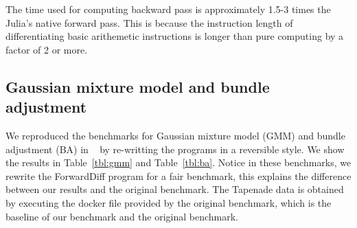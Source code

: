 \documentclass{article}
\newcommand{\<}{\langle}
\renewcommand{\>}{\rangle}
\newcommand{\Tbl}[1]{Table~\ref{#1}}
\newcommand{\ra}[1]{\renewcommand{\arraystretch}{#1}}
\theoremstyle{definition}\newtheorem{definition}{\textit{Definition}}
\begin{document}
The time used for computing backward pass is approximately 1.5-3 times the Julia's native forward pass.
This is because the instruction length of differentiating basic arithemetic instructions is longer than pure computing by a factor of 2 or more.

\subsection{Gaussian mixture model and bundle adjustment}

We reproduced the benchmarks for Gaussian mixture model (GMM) and bundle adjustment (BA) in ~\cite{Srajer2018} by re-writting the programs in a reversible style. We show the results in \Tbl{tbl:gmm} and \Tbl{tbl:ba}. Notice in these benchmarks, we rewrite the ForwardDiff program for a fair benchmark, this explains the difference between our results and the original benchmark. The Tapenade data is obtained by executing the docker file provided by the original benchmark, which is the baseline of our benchmark and the original benchmark.

\begin{table}[h!]\centering
    \scriptsize
\begin{minipage}{\columnwidth}
\ra{1.3}
    \caption{Absolute runtimes in seconds for computing the objective (O) and gradients (G) of GMM with 10k data points.}\label{tbl:gmm}
\end{minipage}
\end{table}
\end{document}
